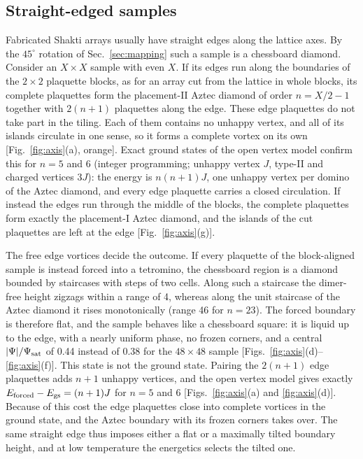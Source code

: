 \documentclass[aps,prb,twocolumn,floatfix,longbibliography]{revtex4-2}
\begin{document}
\subsection{Straight-edged samples}
\label{sec:axis}

Fabricated Shakti arrays usually have straight edges along the lattice axes. By the $45^\circ$ rotation of Sec.~\ref{sec:mapping} such a sample is a chessboard diamond. Consider an $X\times X$ sample with even $X$. If its edges run along the boundaries of the $2\times2$ plaquette blocks, as for an array cut from the lattice in whole blocks, its complete plaquettes form the placement-II Aztec diamond of order $n=X/2-1$ together with $2(n+1)$ plaquettes along the edge. These edge plaquettes do not take part in the tiling. Each of them contains no unhappy vertex, and all of its islands circulate in one sense, so it forms a complete vortex on its own [Fig.~\ref{fig:axis}(a), orange]. Exact ground states of the open vertex model confirm this for $n=5$ and 6 (integer programming; unhappy vertex $J$, type-II and charged vertices $3J$): the energy is $n(n+1)J$, one unhappy vertex per domino of the Aztec diamond, and every edge plaquette carries a closed circulation. If instead the edges run through the middle of the blocks, the complete plaquettes form exactly the placement-I Aztec diamond, and the islands of the cut plaquettes are left at the edge [Fig.~\ref{fig:axis}(g)].

The free edge vortices decide the outcome. If every plaquette of the block-aligned sample is instead forced into a tetromino, the chessboard region is a diamond bounded by staircases with steps of two cells. Along such a staircase the dimer-free height zigzags within a range of 4, whereas along the unit staircase of the Aztec diamond it rises monotonically (range 46 for $n=23$). The forced boundary is therefore flat, and the sample behaves like a chessboard square: it is liquid up to the edge, with a nearly uniform phase, no frozen corners, and a central $|\Psi|/\Psi_{\rm sat}$ of 0.44 instead of 0.38 for the $48\times48$ sample [Figs.~\ref{fig:axis}(d)--\ref{fig:axis}(f)]. This state is not the ground state. Pairing the $2(n+1)$ edge plaquettes adds $n+1$ unhappy vertices, and the open vertex model gives exactly $E_{\rm forced}-E_{\rm gs}=(n+1)J$ for $n=5$ and 6 [Figs.~\ref{fig:axis}(a) and \ref{fig:axis}(d)]. Because of this cost the edge plaquettes close into complete vortices in the ground state, and the Aztec boundary with its frozen corners takes over. The same straight edge thus imposes either a flat or a maximally tilted boundary height, and at low temperature the energetics selects the tilted one.
\end{document}
